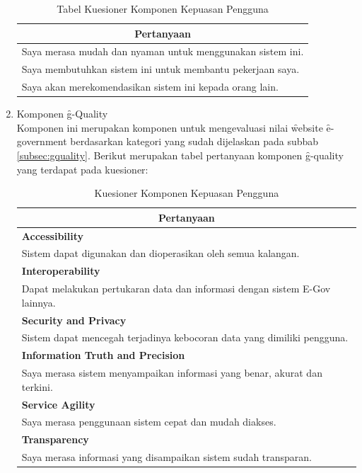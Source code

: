 \begin{enumerate}
	\begin{table}
		\centering
		\caption{Tabel Kuesioner Komponen Kepuasan Pengguna}
		\begin{tabular}{|p{11.2cm}|}
			\hline
			\multicolumn{1}{|c|}{{\bf Pertanyaan}}						\\ \hline
			Saya merasa mudah dan nyaman untuk menggunakan sistem ini.	\\ \hline
			Saya membutuhkan sistem ini untuk membantu pekerjaan saya.	\\ \hline
			Saya akan merekomendasikan sistem ini kepada orang lain.	\\ \hline
		\end{tabular}
	\end{table}
	\item Komponen \f{g-Quality}\\
	Komponen ini merupakan komponen untuk mengevaluasi nilai \f{website} \f{e-government} berdasarkan kategori yang sudah dijelaskan pada subbab \ref{subsec:gquality}. Berikut merupakan tabel pertanyaan komponen \f{g-quality} yang terdapat pada kuesioner:
	\begin{center}
	\begin{longtable}{|p{11.2cm}|}
		\caption{Kuesioner Komponen Kepuasan Pengguna} \\
		\hline
			\multicolumn{1}{|c|}{{\bf Pertanyaan}}										\\ \hline
			{\bf Accessibility}															\\
			Sistem dapat digunakan dan dioperasikan oleh semua kalangan.               	\\ \hline
			{\bf Interoperability}                                                      \\
			Dapat melakukan pertukaran data dan informasi dengan sistem E-Gov lainnya.  \\ \hline
			{\bf Security and Privacy}                                                  \\
			Sistem dapat mencegah terjadinya kebocoran data yang dimiliki pengguna.     \\ \hline
			{\bf Information Truth and Precision}                                       \\
			Saya merasa sistem menyampaikan informasi yang benar, akurat dan terkini.   \\ \hline
			{\bf Service Agility}                                                       \\
			Saya merasa penggunaan sistem cepat dan mudah diakses.                      \\ \hline
			{\bf Transparency}                                                          \\
			Saya merasa informasi yang disampaikan sistem sudah transparan.				\\ \hline
	\end{longtable}
\end{center}
\end{enumerate}
